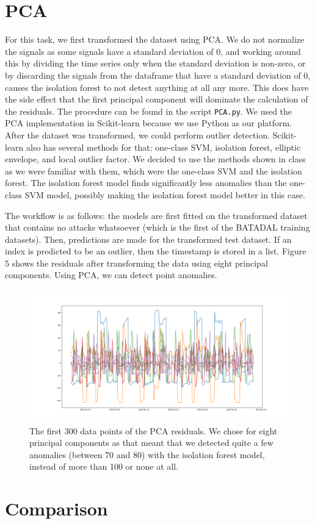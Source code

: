 \documentclass[]{article}
\begin{document}
\section{PCA}
For this task, we first transformed the dataset using PCA. We do not normalize the signals as some signals have a standard deviation of 0, and working around this by dividing the time series only when the standard deviation is non-zero, or by discarding the signals from the dataframe that have a standard deviation of 0, causes the isolation forest to not detect anything at all any more. This does have the side effect that the first principal component will dominate the calculation of the residuals. The procedure can be found in the script \texttt{PCA.py}. We used the PCA implementation in Scikit-learn because we use Python as our platform. After the dataset was transformed, we could perform outlier detection. Scikit-learn also has several methods for that: one-class SVM, isolation forest, elliptic envelope, and local outlier factor. We decided to use the methods shown in class as we were familiar with them, which were the one-class SVM and the isolation forest. The isolation forest model finds significantly less anomalies than the one-class SVM model, possibly making the isolation forest model better in this case.

The workflow is as follows: the models are first fitted on the transformed dataset that contains no attacks whatsoever (which is the first of the BATADAL training datasets). Then, predictions are made for the transformed test dataset. If an index is predicted to be an outlier, then the timestamp is stored in a list. Figure 5 shows the residuals after transforming the data using eight principal components. Using PCA, we can detect point anomalies.
\begin{center}
	\begin{figure}[H]
		\includegraphics[width=18cm, keepaspectratio]{./visuallizations/PCA_residuals.png}
		\caption{The first 300 data points of the PCA residuals. We chose for eight principal components as that meant that we detected quite a few anomalies (between 70 and 80) with the isolation forest model, instead of more than 100 or none at all.}
		\label{signals}
	\end{figure}
\end{center}
\clearpage
\section{Comparison} 
\end{document}
